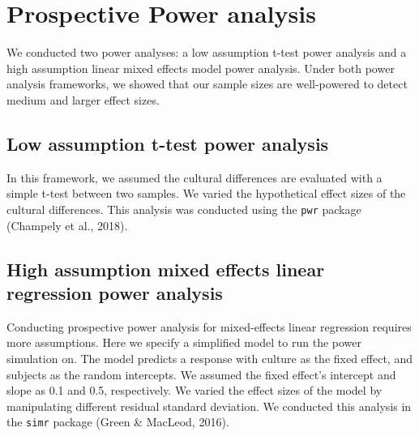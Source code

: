 \documentclass[
  man,floatsintext]{apa6}
\begin{document}
\hypertarget{prospective-power-analysis}{%
\section{Prospective Power analysis}\label{prospective-power-analysis}}

We conducted two power analyses: a low assumption t-test power analysis and a high assumption linear mixed effects model power analysis. Under both power analysis frameworks, we showed that our sample sizes are well-powered to detect medium and larger effect sizes.

\hypertarget{low-assumption-t-test-power-analysis}{%
\subsection{Low assumption t-test power analysis}\label{low-assumption-t-test-power-analysis}}

In this framework, we assumed the cultural differences are evaluated with a simple t-test between two samples. We varied the hypothetical effect sizes of the cultural differences. This analysis was conducted using the \texttt{pwr} package (Champely et al., 2018).

\hypertarget{high-assumption-mixed-effects-linear-regression-power-analysis}{%
\subsection{High assumption mixed effects linear regression power analysis}\label{high-assumption-mixed-effects-linear-regression-power-analysis}}

Conducting prospective power analysis for mixed-effects linear regression requires more assumptions. Here we specify a simplified model to run the power simulation on. The model predicts a response with culture as the fixed effect, and subjects as the random intercepts. We assumed the fixed effect's intercept and slope as 0.1 and 0.5, respectively. We varied the effect sizes of the model by manipulating different residual standard deviation. We conducted this analysis in the \texttt{simr} package (Green \& MacLeod, 2016).
\end{document}
